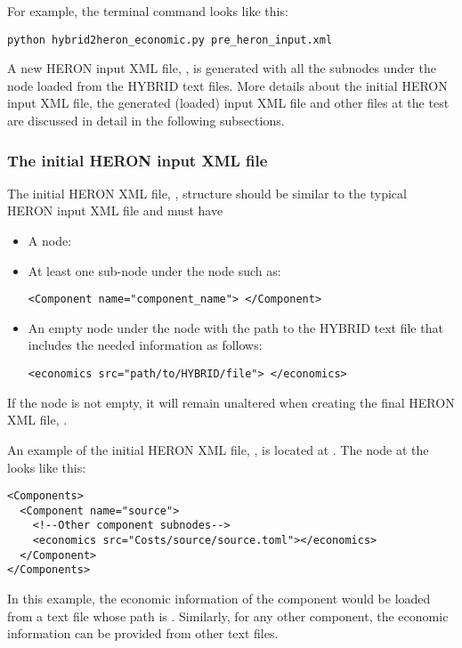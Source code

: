 For example, the terminal command looks like this:
\begin{lstlisting}
python hybrid2heron_economic.py pre_heron_input.xml
\end{lstlisting}
A new HERON input XML file, , is generated with all the subnodes under the  node loaded from the HYBRID text files. More details about the initial HERON input XML file, the generated (loaded) input XML file and other files at the  test are discussed in detail in the following subsections. 

\subsubsection{The initial HERON input XML file}
The initial HERON XML file, , structure should be similar to the typical HERON input XML file and must have
\begin{itemize}
\item A  node: 
\item At least one  sub-node under the  node such as:
\begin{lstlisting}[style=XML,morekeywords={class}]
<Component name="component_name"> </Component>
\end{lstlisting}   

\item An empty  node under the  node with the path to the HYBRID text file that includes the needed information as follows:
\begin{lstlisting}[style=XML,morekeywords={class}]
<economics src="path/to/HYBRID/file"> </economics>
\end{lstlisting}   
\end{itemize}
If the  node is not empty, it will remain unaltered when creating the final HERON XML file, .

An example of the initial HERON XML file, , is located at . 
The  node at the  looks like this:
\begin{lstlisting}[style=XML,morekeywords={class}]
<Components>
  <Component name="source">
    <!--Other component subnodes-->
    <economics src="Costs/source/source.toml"></economics>
  </Component>
</Components>
\end{lstlisting}
In this example, the economic information of the component  would be loaded from a text file whose path is . Similarly, for any other component, the economic information can be provided from other text files. 

